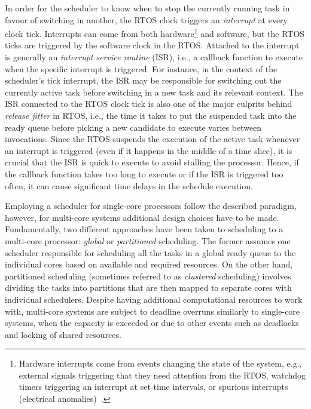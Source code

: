 In order for the scheduler to know when to stop the currently running task in favour of switching in another, the RTOS clock triggers an \emph{interrupt} at every clock tick.
Interrupts can come from both hardware\footnote{Hardware interrupts come from events changing the state of the system, e.g., external signals triggering that they need attention from the RTOS, watchdog timers triggering an interrupt at set time intervals, or spurious interrupts (electrical anomalies)~\addref{}.} and software, but the RTOS ticks are triggered by the software clock in the RTOS.
Attached to the interrupt is generally an \emph{interrupt service routine} (ISR), i.e., a callback function to execute when the specific interrupt is triggered.
For instance, in the context of the scheduler's tick interrupt, the ISR may be responsible for switching out the currently active task before switching in a new task and its relevant context.
The ISR connected to the RTOS clock tick is also one of the major culprits behind \emph{release jitter} in RTOS, i.e., the time it takes to put the suspended task into the ready queue before picking a new candidate to execute varies between invocations.
Since the RTOS suspends the execution of the active task whenever an interrupt is triggered (even if it happens in the middle of a time slice), it is crucial that the ISR is quick to execute to avoid stalling the processor.
Hence, if the callback function takes too long to execute or if the ISR is triggered too often, it can cause significant time delays in the schedule execution.

Employing a scheduler for single-core processors follow the described paradigm, however, for multi-core systems additional design choices have to be made.
Fundamentally, two different approaches have been taken to scheduling to a multi-core processor: \emph{global} or \emph{partitioned} scheduling.
The former assumes one scheduler responsible for scheduling all the tasks in a global ready queue to the individual cores based on available and required resources.
On the other hand, partitioned scheduling (sometimes referred to as \emph{clustered} scheduling) involves dividing the tasks into partitions that are then mapped to separate cores with individual schedulers.
Despite having additional computational resources to work with, multi-core systems are subject to deadline overruns similarly to single-core systems, when the capacity is exceeded or due to other events such as deadlocks and locking of shared resources.


